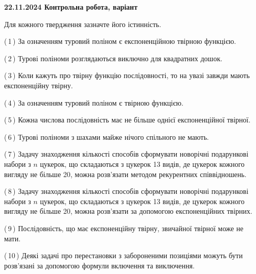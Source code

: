 \documentclass[12pt, ukrainian]{article}
\begin{document}
\begin {large}
{\vspace{5mm}
}
\newpage

\begin {large}

\textbf{22.11.2024 Контрольна робота, варіант  }\par


{
Для кожного твердження зазначте його істинність.\par

\vspace{2mm}

(\,1\,) За означенням туровий поліном є експоненційною твірною функцією.%



(\,2\,) Турові поліноми розглядаються виключно для квадратних дошок.%



(\,3\,) Коли кажуть про твірну функцію послідовності, то на увазі завжди мають експоненційну твірну.%



(\,4\,) За означенням туровий поліном є твірною функцією.%



(\,5\,) Кожна числова послідовність має не більше однієї  експоненційної твірної.%



(\,6\,) Турові поліноми з шахами майже нічого спільного не мають.%



(\,7\,) Задачу знаходження кількості способів сформувати новорічні подарункові набори з $n$ цукерок, що складаються з цукерок 13 видів, де цукерок кожного вигляду не більше 20, можна розв’язати методом рекурентних співвідношень.%



(\,8\,) Задачу знаходження кількості способів сформувати новорічні подарункові набори з $n$ цукерок, що складаються з цукерок 13 видів, де цукерок кожного вигляду не більше 20, можна розв’язати за допомогою експоненційних твірних.%



(\,9\,) Послідовність, що має експоненційну твірну, звичайної твірної може не мати.%



(\,10\,) Деякі задачі про перестановки з забороненими позиціями можуть бути розв’я\-за\-ні за допомогою формули включення та виключення.%




\vspace{5mm}
}
\newpage


\end{large}
\end{large}
\end{document}
